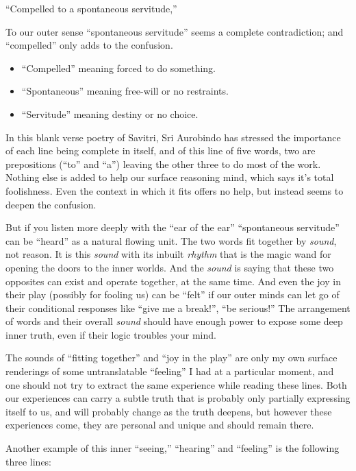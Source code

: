 \documentclass[12pt,a4paper]{book}
\begin{document}
``Compelled to a spontaneous servitude,''

To our outer sense ``spontaneous servitude'' seems a complete
contradiction; and ``compelled'' only adds to the confusion.

\begin{itemize}
\item [] ``Compelled'' meaning forced to do something.
\item [] ``Spontaneous'' meaning free-will or no restraints.
\item [] ``Servitude'' meaning destiny or no choice.
\end{itemize}

In this blank verse poetry of Savitri, Sri Aurobindo has stressed the
importance of each line being complete in itself, and of this line of
five words, two are prepositions (``to'' and ``a'') leaving the other
three to do most of the work. Nothing else is added to help our
surface reasoning mind, which says it's total foolishness. Even the
context in which it fits offers no help, but instead seems to deepen
the confusion.

But if you listen more deeply with the ``ear of the ear''
``spontaneous servitude'' can be ``heard'' as a natural flowing
unit. The two words fit together by \emph{sound}, not reason. It is
this \emph{sound} with its inbuilt \emph{rhythm} that is the magic
wand for opening the doors to the inner worlds. And the \emph{sound}
is saying that these two opposites can exist and operate together, at
the same time. And even the joy in their play (possibly for fooling
us) can be ``felt'' if our outer minds can let go of their conditional
responses like ``give me a break!'', ``be serious!''  The arrangement
of words and their overall \emph{sound} should have enough power to
expose some deep inner truth, even if their logic troubles your mind.

The sounds of ``fitting together'' and ``joy in the play'' are only my
own surface renderings of some untranslatable ``feeling'' I had at a
particular moment, and one should not try to extract the same
experience while reading these lines. Both our experiences can carry a
subtle truth that is probably only partially expressing itself to us,
and will probably change as the truth deepens, but however these
experiences come, they are personal and unique and should remain
there.

Another example of this inner ``seeing,'' ``hearing'' and ``feeling''
is the following three lines:
\end{document}
